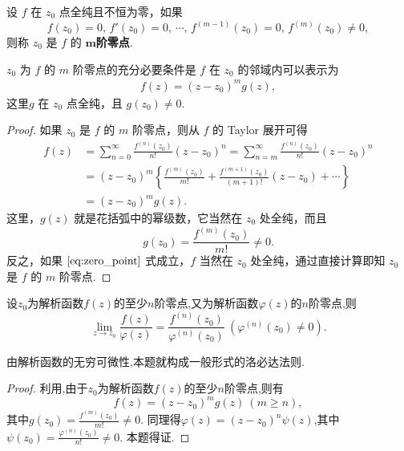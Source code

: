 \documentclass[../../main.tex]{subfiles}%
\begin{document}
\begin{definition}
设 \( f \) 在 \( z_0 \) 点全纯且不恒为零，如果
\[
f(z_0) = 0, \, f'(z_0) = 0, \, \cdots, \, f^{(m - 1)}(z_0) = 0, \, f^{(m)}(z_0) \neq 0,
\]
则称 \( z_0 \) 是 \( f \) 的 $\boldsymbol{m}$\textbf{阶零点}.
\end{definition}

\begin{theorem}\label{theorem:复变函数-----定理4.3.4}
\( z_0 \) 为 \( f \) 的 \( m \) 阶零点的充分必要条件是 \( f \) 在 \( z_0 \) 的邻域内可以表示为
\begin{align}
f(z) = (z - z_0)^m g(z), \label{eq:zero_point}
\end{align}
这里\( g \) 在 \( z_0 \) 点全纯，且 \( g(z_0) \neq 0 \).
\end{theorem}
\begin{proof}
如果 \( z_0 \) 是 \( f \) 的 \( m \) 阶零点，则从 \( f \) 的 Taylor 展开可得
\begin{align*}
f(z) &= \sum_{n=0}^{\infty} \frac{f^{(n)}(z_0)}{n!} (z - z_0)^n = \sum_{n=m}^{\infty} \frac{f^{(n)}(z_0)}{n!} (z - z_0)^n \\
&= (z - z_0)^m \left\{ \frac{f^{(m)}(z_0)}{m!} + \frac{f^{(m + 1)}(z_0)}{(m + 1)!} (z - z_0) + \cdots \right\} \\
&= (z - z_0)^m g(z).
\end{align*}
这里，\( g(z) \) 就是花括弧中的幂级数，它当然在 \( z_0 \) 处全纯，而且
\[
g(z_0) = \frac{f^{(m)}(z_0)}{m!} \neq 0.
\]
反之，如果 \(\eqref{eq:zero_point}\) 式成立，\( f \) 当然在 \( z_0 \) 处全纯，通过直接计算即知 \( z_0 \) 是 \( f \) 的 \( m \) 阶零点.
\end{proof}

\begin{theorem}\label{theorem:解析函数一般形式的L'Hospital法则}
设$z_0$为解析函数$f(z)$的至少$n$阶零点,又为解析函数$\varphi(z)$的$n$阶零点,则
$$\lim\limits_{z \to z_0} \frac{f(z)}{\varphi(z)} = \frac{f^{(n)}(z_0)}{\varphi^{(n)}(z_0)} \ (\varphi^{(n)}(z_0) \neq 0).$$
\end{theorem}
\begin{remark}
由解析函数的无穷可微性,本题就构成一般形式的洛必达法则.
\end{remark}
\begin{proof}
利用,由于$z_0$为解析函数$f(z)$的至少$n$阶零点,则有
$$f(z) = (z - z_0)^m g(z) \ (m \geqslant n),$$
其中$g(z_0) = \frac{f^{(m)}(z_0)}{m!} \neq 0.$
同理得$\varphi(z) = (z - z_0)^n \psi(z)$,其中$\psi(z_0) = \frac{\varphi^{(n)}(z_0)}{n!} \neq 0.$
本题得证.
\end{proof}
\end{document}
